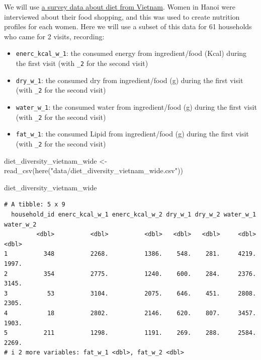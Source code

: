 \documentclass[
  letterpaper,
  DIV=11,
  numbers=noendperiod]{scrreprt}
\newenvironment{Shaded}{\begin{snugshade}}{\end{snugshade}}
\newcommand{\FunctionTok}[1]{\textcolor[rgb]{0.28,0.35,0.67}{#1}}
\newcommand{\NormalTok}[1]{\textcolor[rgb]{0.00,0.23,0.31}{#1}}
\newcommand{\OtherTok}[1]{\textcolor[rgb]{0.00,0.23,0.31}{#1}}
\newcommand{\StringTok}[1]{\textcolor[rgb]{0.13,0.47,0.30}{#1}}
\begin{document}
\begin{tcolorbox}[enhanced jigsaw, title=\textcolor{quarto-callout-tip-color}{\faLightbulb}\hspace{0.5em}{Practice}, colbacktitle=quarto-callout-tip-color!10!white, leftrule=.75mm, arc=.35mm, opacityback=0, bottomrule=.15mm, rightrule=.15mm, toptitle=1mm, breakable, toprule=.15mm, colback=white, coltitle=black, colframe=quarto-callout-tip-color-frame, bottomtitle=1mm, titlerule=0mm, left=2mm, opacitybacktitle=0.6]

We will use
\href{https://www.wur.nl/en/project/Retail-Diversity-for-Dietary-Diversity-RD4DD.htm}{a
survey data about diet from Vietnam}. Women in Hanoi were interviewed
about their food shopping, and this was used to create nutrition
profiles for each women. Here we will use a subset of this data for 61
households who came for 2 visits, recording:

\begin{itemize}
\item
  \texttt{enerc\_kcal\_w\_1}: the consumed energy from ingredient/food
  (Kcal) during the first visit (with \texttt{\_2} for the second visit)
\item
  \texttt{dry\_w\_1}: the consumed dry from ingredient/food (g) during
  the first visit (with \texttt{\_2} for the second visit)
\item
  \texttt{water\_w\_1}: the consumed water from ingredient/food (g)
  during the first visit (with \texttt{\_2} for the second visit)
\item
  \texttt{fat\_w\_1}: the consumed Lipid from ingredient/food (g) during
  the first visit (with \texttt{\_2} for the second visit)
\end{itemize}

\begin{Shaded}
\begin{Highlighting}[]
\NormalTok{diet\_diversity\_vietnam\_wide }\OtherTok{\textless{}{-}} \FunctionTok{read\_csv}\NormalTok{(}\FunctionTok{here}\NormalTok{(}\StringTok{"data/diet\_diversity\_vietnam\_wide.csv"}\NormalTok{))}

\NormalTok{diet\_diversity\_vietnam\_wide}
\end{Highlighting}
\end{Shaded}

\begin{verbatim}
# A tibble: 5 x 9
  household_id enerc_kcal_w_1 enerc_kcal_w_2 dry_w_1 dry_w_2 water_w_1 water_w_2
         <dbl>          <dbl>          <dbl>   <dbl>   <dbl>     <dbl>     <dbl>
1          348          2268.          1386.    548.    281.     4219.     1997.
2          354          2775.          1240.    600.    284.     2376.     3145.
3           53          3104.          2075.    646.    451.     2808.     2305.
4           18          2802.          2146.    620.    807.     3457.     1903.
5          211          1298.          1191.    269.    288.     2584.     2269.
# i 2 more variables: fat_w_1 <dbl>, fat_w_2 <dbl>
\end{verbatim}


\end{tcolorbox}
\end{document}
